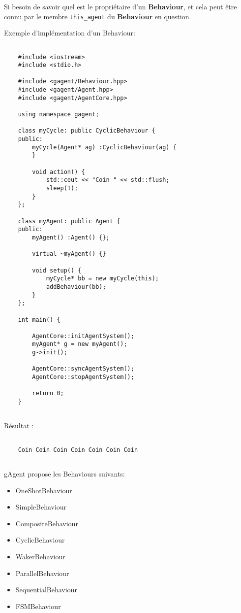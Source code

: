 Si besoin de savoir quel est le propriétaire d'un \textbf{Behaviour}, et cela peut être connu par le membre \texttt{this\_agent} du \textbf{Behaviour} en question. 

Exemple d'implémentation d'un Behaviour:

\begin{lstlisting}

	#include <iostream>
	#include <stdio.h>

	#include <gagent/Behaviour.hpp>
	#include <gagent/Agent.hpp>
	#include <gagent/AgentCore.hpp>

	using namespace gagent;

	class myCycle: public CyclicBehaviour {
	public:
		myCycle(Agent* ag) :CyclicBehaviour(ag) {
		}

		void action() {
			std::cout << "Coin " << std::flush;
			sleep(1);
		}
	};

	class myAgent: public Agent {
	public:
		myAgent() :Agent() {};

		virtual ~myAgent() {}

		void setup() {
			myCycle* bb = new myCycle(this);
			addBehaviour(bb);
		}
	};

	int main() {

		AgentCore::initAgentSystem();
		myAgent* g = new myAgent();
		g->init();

		AgentCore::syncAgentSystem();
		AgentCore::stopAgentSystem();

		return 0;
	}
	
\end{lstlisting}

Résultat : 

\begin{lstlisting}[backgroundcolor=\color{green!5}]

	Coin Coin Coin Coin Coin Coin Coin 
 
\end{lstlisting}


gAgent propose les Behaviours suivants: 

\begin{itemize}
 \item OneShotBehaviour
 \item SimpleBehaviour
 \item CompositeBehaviour
 \item CyclicBehaviour
 \item WakerBehaviour
 \item ParallelBehaviour
 \item SequentialBehaviour
 \item FSMBehaviour
\end{itemize}

